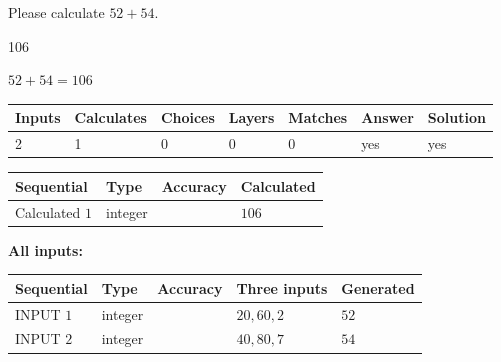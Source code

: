 \documentclass[12pt]{article}
\begin{document}
  
 
Please calculate $ %
52 +  %
54 $.
 
 
 
\noindent{}
 
 

106
 
 
\noindent{}
 
 

 
 
 
\noindent{}
 
 

$ %
52 +  %
54=   %
106$
 
 
\noindent{}
 
 

 
   
   
   
   
\noindent\begin{tabular}{|l|l|l|l|l|l|l|}
 \hline
Inputs & Calculates & Choices & Layers & Matches & Answer & Solution \\ \hline
 2  & 
 1  & 
 0
  & 
 0  & 
 0  & 
  yes & 
  yes 
  \\ \hline
 \end{tabular}
   
   
   
   
\noindent{}
   
   
  
  
\noindent\begin{tabular}{|l|l|l|l|}
\hline
 Sequential & Type & Accuracy & Calculated \\ 
\hline
 
 
  Calculated $  1 $ & integer &  & 
  $ 106 $ 
 \\  \hline  
 \end{tabular}
   
   
   
   
\noindent\vspace{0.1in}\hspace{-0.08in} {\textbf{\Large{All inputs: }}}
   
   
  
  
\noindent\begin{tabular}{|l|l|l|l|l|}
\hline
 Sequential & Type & Accuracy & Three inputs & Generated \\ 
\hline
 
 
  INPUT $  1 $ & integer &  & $
 20
 , 
 60
 , 
 2
 $ & $ 52 $ 
 \\  \hline  
 
 
  INPUT $  2 $ & integer &  & $
 40
 , 
 80
 , 
 7
 $ & $ 54 $ 
 \\  \hline  
 \end{tabular}
   
\end{document}
